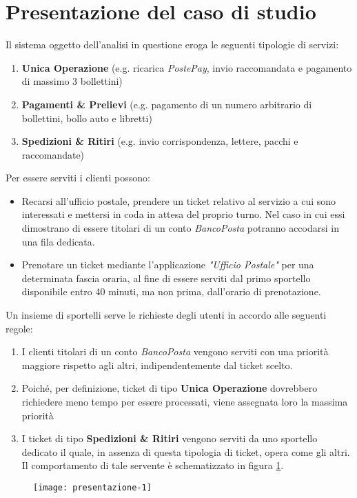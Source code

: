 \section{Presentazione del caso di studio}
Il sistema oggetto dell'analisi in questione eroga le seguenti tipologie di servizi:
\begin{enumerate}
\item \textbf{Unica Operazione} (e.g. ricarica \textsl{PostePay}, invio raccomandata e pagamento di massimo 3 bollettini)
\item \textbf{Pagamenti \& Prelievi} (e.g. pagamento di un numero arbitrario di bollettini, bollo auto e libretti)  
\item \textbf{Spedizioni \& Ritiri} (e.g. invio corrispondenza, lettere, pacchi e raccomandate)
\end{enumerate}

Per essere serviti i clienti possono:
\begin{itemize}
\item Recarsi all'ufficio postale, prendere un ticket relativo al servizio a cui sono interessati e mettersi in coda in attesa del proprio turno. Nel caso in cui essi dimostrano di essere titolari di un conto \textsl{BancoPosta} potranno accodarsi in una fila dedicata.
\item Prenotare un ticket mediante l'applicazione \textsl{"Ufficio Postale"} per una determinata fascia oraria, al fine di essere serviti dal primo sportello disponibile entro 40 minuti, ma non prima, dall'orario di prenotazione.
\end{itemize}

Un insieme di sportelli serve le richieste degli utenti in accordo alle seguenti regole: 
\begin{enumerate}[label=R\arabic*)]
\item I clienti titolari di un conto \textsl{BancoPosta} vengono serviti con una priorità maggiore rispetto agli altri, indipendentemente dal ticket scelto.
\item Poiché, per definizione, ticket di tipo \textbf{Unica Operazione} dovrebbero richiedere meno tempo per essere processati, viene assegnata loro la massima priorità
\item I ticket di tipo \textbf{Spedizioni \& Ritiri} vengono serviti da uno sportello dedicato il quale, in assenza di questa tipologia di ticket, opera come gli altri. Il comportamento di tale servente è schematizzato in figura \ref{fig:presentazione-1}. 
\end{enumerate}

\begin{figure}[ht]
\centering
\texttt{[image: presentazione-1]}
\label{fig:presentazione-1}
\end{figure}